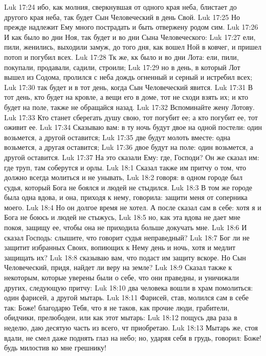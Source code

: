 \vs Luk 17:24 ибо, как молния, сверкнувшая от одного края неба, блистает до другого края неба, так будет Сын Человеческий в день Свой.
\vs Luk 17:25 Но прежде надлежит Ему много пострадать и быть отвержену родом сим.
\vs Luk 17:26 И как было во дни Ноя, так будет и во дни Сына Человеческого:
\vs Luk 17:27 ели, пили, женились, выходили замуж, до того дня, как вошел Ной в ковчег, и пришел потоп и погубил всех.
\vs Luk 17:28 Тк же, кк было и во дни Лота: ели, пили, покупали, продавали, садили, строили;
\vs Luk 17:29 но в день, в который Лот вышел из Содома, пролился с неба дождь огненный и серный и истребил всех;
\vs Luk 17:30 так будет и в тот день, когда Сын Человеческий явится.
\vs Luk 17:31 В тот день, кто будет на кровле, а вещи его в доме, тот не сходи взять их; и кто будет на поле, также не обращайся назад.
\vs Luk 17:32 Вспоминайте жену Лотову.
\vs Luk 17:33 Кто станет сберегать душу свою, тот погубит ее; а кто погубит ее, тот оживит ее.
\vs Luk 17:34 Сказываю вам: в ту ночь будут двое на одной постели: один возьмется, а другой оставится;
\vs Luk 17:35 две будут молоть вместе: одна возьмется, а другая оставится;
\vs Luk 17:36 двое будут на поле: один возьмется, а другой оставится.
\vs Luk 17:37 На это сказали Ему: где, Господи? Он же сказал им: где труп, там соберутся и орлы.
\vs Luk 18:1 Сказал также им притчу о том, что должно всегда молиться и не унывать,
\vs Luk 18:2 говоря: в одном городе был судья, который Бога не боялся и людей не стыдился.
\vs Luk 18:3 В том же городе была одна вдова, и она, приходя к нему, говорила: защити меня от соперника моего.
\vs Luk 18:4 Но он долгое время не хотел. А после сказал сам в себе: хотя я и Бога не боюсь и людей не стыжусь,
\vs Luk 18:5 но, как эта вдова не дает мне покоя, защищу ее, чтобы она не приходила больше докучать мне.
\vs Luk 18:6 И сказал Господь: слышите, что говорит судья неправедный?
\vs Luk 18:7 Бог ли не защитит избранных Своих, вопиющих к Нему день и ночь, хотя и медлит защищать их?
\vs Luk 18:8 сказываю вам, что подаст им защиту вскоре. Но Сын Человеческий, придя, найдет ли веру на земле?
\rsbpar\vs Luk 18:9 Сказал также к некоторым, которые уверены были о себе, что они праведны, и уничижали других, следующую притчу:
\vs Luk 18:10 два человека вошли в храм помолиться: один фарисей, а другой мытарь.
\vs Luk 18:11 Фарисей, став, молился сам в себе так: Боже! благодарю Тебя, что я не таков, как прочие люди, грабители, обидчики, прелюбодеи, или как этот мытарь:
\vs Luk 18:12 пощусь два раза в неделю, даю десятую часть из всего, чт приобретаю.
\vs Luk 18:13 Мытарь же, стоя вдали, не смел даже поднять глаз на небо; но, ударяя себя в грудь, говорил: Боже! будь милостив ко мне грешнику!
